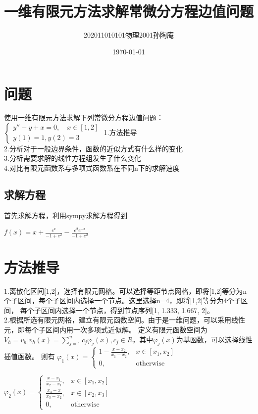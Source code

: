 \documentclass[12pt, a4paper, oneside]{ctexart}
\title{一维有限元方法求解常微分方程边值问题}
\date{\today}
\author{202011010101物理2001孙陶庵}
\begin{document}
\begin{spacing}{2.0}
\tableofcontents
\maketitle

\section{问题}
使用一维有限元方法求解下列常微分方程边值问题：
$\displaystyle \left\{\begin{matrix}y''-y+x=0,\quad x\in\left[1,2\right]\\ y\left(1\right)=1,y\left(2\right)=3\end{matrix}\right.$
1.方法推导\\
2.分析对于一般边界条件，函数的近似方式有什么样的变化\\
3.分析需要求解的线性方程组发生了什么变化\\
4.对比有限元函数系与多项式函数系在不同n下的求解速度\\
\subsection{求解方程}
首先求解方程，利用sympy求解方程得到
\begin{center}
    $\displaystyle f{\left(x \right)} = x + \frac{e^{x}}{-1 + e^{2}} - \frac{e^{2} e^{- x}}{-1 + e^{2}}$
\end{center}
\section{方法推导}
1.离散化区间[1,2]，选择有限元网格。可以选择等距节点网格，即将[1,2]等分为n个子区间，每个子区间内选择一个节点。这里选择n=4，即将[1,2]等分为4个子区间，
每个子区间内选择一个节点，得到节点序列[1, 1.333, 1.667, 2]。
\\
2.根据所选有限元网格，建立有限元函数空间。由于是一维问题，可以采用线性元，即每个子区间内用一次多项式近似解。
定义有限元函数空间为$\displaystyle V_h={v_h|v_h(x)=\sum_{j=1}^{n}c_j\varphi_j(x),c_j\in R}$，其中$\varphi_j(x)$为基函数，可以选择线性插值函数。
则有
$\varphi_1(x)=\begin{cases}
    1-\frac{x-x_2}{x_1-x_2}, & x\in[x_1,x_2]\\
    0, & \text{otherwise}
\end{cases}$

$\varphi_2(x)=\begin{cases}
    \frac{x-x_1}{x_2-x_1}, & x\in[x_1,x_2]\\
    \frac{x_3-x}{x_3-x_2}, & x\in[x_2,x_3]\\
    0, & \text{otherwise}
\end{cases}$


\end{spacing}
\end{document}

